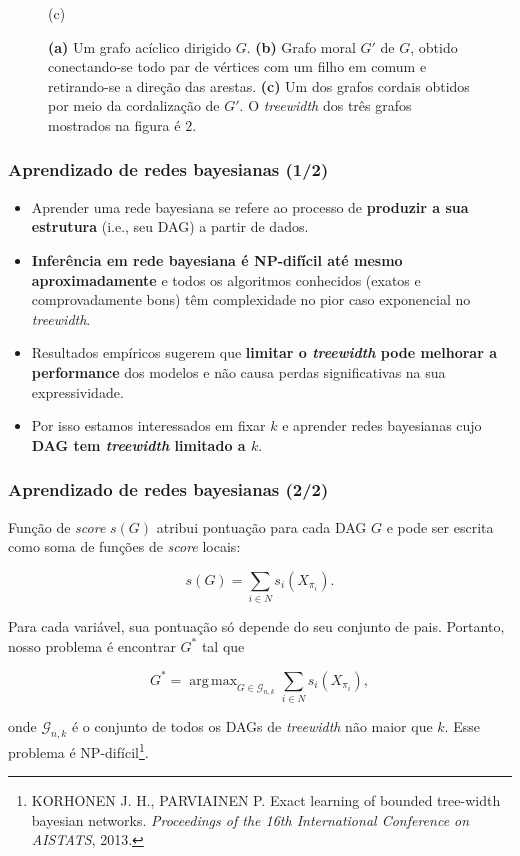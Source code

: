 \documentclass{beamer}
\DeclareMathOperator*{\argmax}{arg\,max}
\begin{document}
\begin{frame}
\begin{figure}
\begin{minipage}{0.3333\textwidth}
        (c)
      \end{minipage}

      \caption{
        \textbf{(a)} Um grafo acíclico dirigido $G$.
        \textbf{(b)} Grafo moral $G'$ de $G$, obtido conectando-se todo par de vértices com um filho em comum e retirando-se a direção das arestas.
        \textbf{(c)} Um dos grafos cordais obtidos por meio da cordalização de $G'$. O \emph{treewidth} dos três grafos mostrados na figura é $2$.
      }
      \label{fig:treewidth}
    \end{figure}
  \end{frame}

  \begin{frame}
    \frametitle{Aprendizado de redes bayesianas (1/2)}

    \begin{itemize}
      \item Aprender uma rede bayesiana se refere ao processo de \textbf{produzir a sua estrutura} (i.e., seu DAG) a partir de dados.
      \item \textbf{Inferência em rede bayesiana é NP-difícil até mesmo aproximadamente} e todos os algoritmos conhecidos (exatos e comprovadamente bons) têm complexidade no pior caso exponencial no \emph{treewidth}.
      \item Resultados empíricos sugerem que \textbf{limitar o \emph{treewidth} pode melhorar a performance} dos modelos e não causa perdas significativas na sua expressividade.
      \item Por isso estamos interessados em fixar $k$ e aprender redes bayesianas cujo \textbf{DAG tem \emph{treewidth} limitado a $k$}.
    \end{itemize}
  \end{frame}

  \begin{frame}[fragile=singleslide]
    \frametitle{Aprendizado de redes bayesianas (2/2)}

    Função de \emph{score} $s(G)$ atribui pontuação para cada DAG $G$ e pode ser escrita como soma de funções de \emph{score} locais:

    {\footnotesize
    $$s(G) = \sum_{i \in N} s_i(X_{\pi_i}).$$
    }

    Para cada variável, sua pontuação só depende do seu conjunto de pais. Portanto, nosso problema é encontrar $G^*$ tal que

    {\footnotesize
    $$G^* = \argmax_{G \in \mathcal{G}_{n,k}} \sum_{i \in N} s_i(X_{\pi_i}),$$
    }

    onde $\mathcal{G}_{n,k}$ é o conjunto de todos os DAGs de \emph{treewidth} não maior que $k$. Esse problema é NP-difícil\footnote{\scriptsize KORHONEN J. H., PARVIAINEN P. Exact learning of bounded tree-width bayesian networks. \emph{Proceedings of the 16th International Conference on AISTATS}, 2013.}.
  \end{frame}
\end{document}
